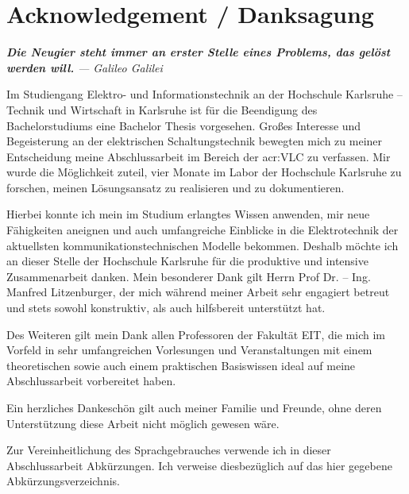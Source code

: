 \chapter*{Acknowledgement / Danksagung}

\textit{\textbf{Die Neugier steht immer an erster Stelle eines Problems, das gelöst
		werden will.}}
\textit{— Galileo Galilei}


Im Studiengang Elektro- und Informationstechnik an der Hochschule Karlsruhe – Technik und Wirtschaft in Karlsruhe ist für die Beendigung des Bachelorstudiums eine Bachelor Thesis vorgesehen. Großes Interesse und Begeisterung an der elektrischen Schaltungstechnik bewegten mich zu meiner Entscheidung meine Abschlussarbeit im Bereich der \gls{acr:VLC} zu verfassen. Mir wurde die Möglichkeit zuteil, vier Monate im Labor der Hochschule Karlsruhe zu forschen, meinen Lösungsansatz zu realisieren und zu dokumentieren.

Hierbei konnte ich mein im Studium erlangtes Wissen anwenden, mir neue Fähigkeiten aneignen und auch umfangreiche Einblicke in die Elektrotechnik der aktuellsten kommunikationstechnischen Modelle bekommen. Deshalb möchte ich an dieser Stelle der Hochschule Karlsruhe für die produktive und intensive Zusammenarbeit danken. Mein besonderer Dank gilt Herrn Prof Dr. – Ing. Manfred Litzenburger, der mich während meiner Arbeit sehr engagiert betreut und stets sowohl konstruktiv, als auch hilfsbereit unterstützt hat.

Des Weiteren gilt mein Dank allen Professoren der Fakultät EIT, die mich im Vorfeld in sehr umfangreichen Vorlesungen und Veranstaltungen mit einem theoretischen sowie auch einem praktischen Basiswissen ideal auf meine Abschlussarbeit vorbereitet haben.

Ein herzliches Dankeschön gilt auch meiner Familie und Freunde, ohne deren Unterstützung
diese Arbeit nicht möglich gewesen wäre.

Zur Vereinheitlichung des Sprachgebrauches verwende ich in dieser Abschlussarbeit Abkürzungen. Ich verweise diesbezüglich auf das hier gegebene Abkürzungsverzeichnis.
